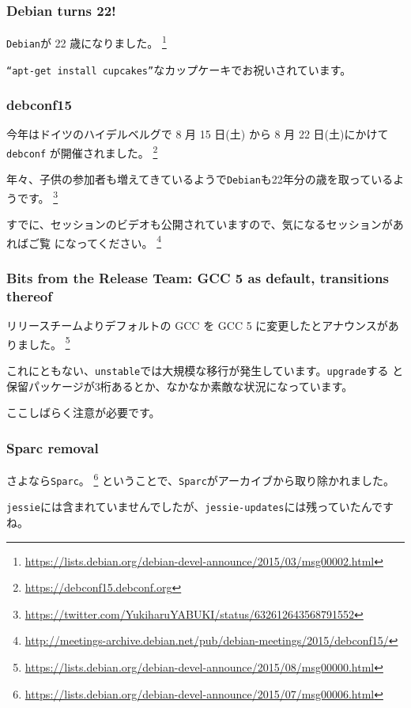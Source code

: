 \documentclass[mingoth,a4paper]{jsarticle}
\begin{document}
\subsubsection{Debian turns 22!}

{\tt Debian}が 22 歳になりました。
\footnote{\url{https://lists.debian.org/debian-devel-announce/2015/03/msg00002.html}}

{\tt ``apt-get install cupcakes''}なカップケーキでお祝いされています。


\subsubsection{debconf15}

今年はドイツのハイデルベルグで 8 月 15 日(土) から 8 月 22 日(土)にかけて{\tt debconf}
が開催されました。
\footnote{\url{https://debconf15.debconf.org}}

年々、子供の参加者も増えてきているようで{\tt Debian}も22年分の歳を取っているようです。
\footnote{\url{https://twitter.com/YukiharuYABUKI/status/632612643568791552}}

すでに、セッションのビデオも公開されていますので、気になるセッションがあればご覧
になってください。
\footnote{\url{http://meetings-archive.debian.net/pub/debian-meetings/2015/debconf15/}}


\subsubsection{Bits from the Release Team: GCC 5 as default, transitions thereof}

リリースチームよりデフォルトの GCC を GCC 5 に変更したとアナウンスがありました。
\footnote{\url{https://lists.debian.org/debian-devel-announce/2015/08/msg00000.html}}

これにともない、{\tt unstable}では大規模な移行が発生しています。{\tt upgrade}する
と保留パッケージが3桁あるとか、なかなか素敵な状況になっています。

ここしばらく注意が必要です。


\subsubsection{Sparc removal}

さよなら{\tt Sparc}。
\footnote{\url{https://lists.debian.org/debian-devel-announce/2015/07/msg00006.html}}
ということで、{\tt Sparc}がアーカイブから取り除かれました。

{\tt jessie}には含まれていませんでしたが、{\tt jessie-updates}には残っていたんですね。
\end{document}
